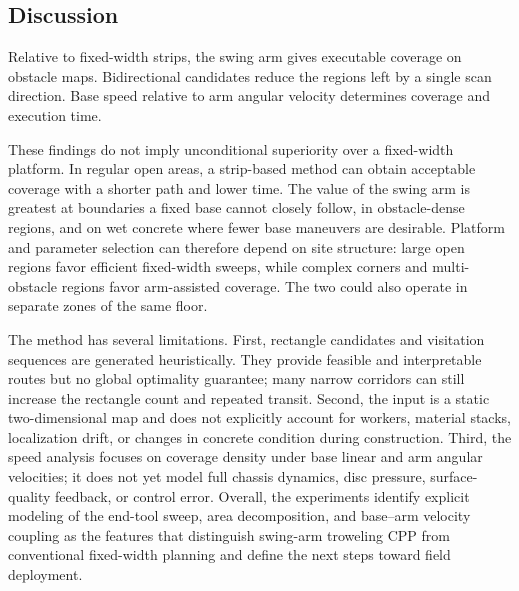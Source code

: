 \subsection{Discussion}

Relative to fixed-width strips, the swing arm gives executable coverage on obstacle maps. Bidirectional candidates reduce the regions left by a single scan direction. Base speed relative to arm angular velocity determines coverage and execution time.

These findings do not imply unconditional superiority over a fixed-width platform. In regular open areas, a strip-based method can obtain acceptable coverage with a shorter path and lower time. The value of the swing arm is greatest at boundaries a fixed base cannot closely follow, in obstacle-dense regions, and on wet concrete where fewer base maneuvers are desirable. Platform and parameter selection can therefore depend on site structure: large open regions favor efficient fixed-width sweeps, while complex corners and multi-obstacle regions favor arm-assisted coverage. The two could also operate in separate zones of the same floor.

The method has several limitations. First, rectangle candidates and visitation sequences are generated heuristically. They provide feasible and interpretable routes but no global optimality guarantee; many narrow corridors can still increase the rectangle count and repeated transit. Second, the input is a static two-dimensional map and does not explicitly account for workers, material stacks, localization drift, or changes in concrete condition during construction. Third, the speed analysis focuses on coverage density under base linear and arm angular velocities; it does not yet model full chassis dynamics, disc pressure, surface-quality feedback, or control error. Overall, the experiments identify explicit modeling of the end-tool sweep, area decomposition, and base--arm velocity coupling as the features that distinguish swing-arm troweling CPP from conventional fixed-width planning and define the next steps toward field deployment.
